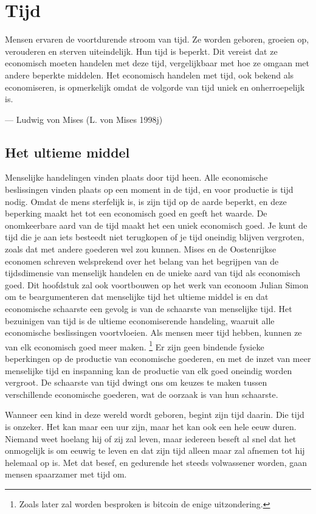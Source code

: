 \documentclass[
  a5paper,
  smalldemyvopaper,11pt,twoside,onecolumn,openright,extrafontsizes,
hidelinks]{memoir}
\begin{document}
\chapter{Tijd}\label{sec-tijd}

Mensen ervaren de voortdurende stroom van tijd. Ze worden geboren,
groeien op, verouderen en sterven uiteindelijk. Hun tijd is beperkt. Dit
vereist dat ze economisch moeten handelen met deze tijd, vergelijkbaar
met hoe ze omgaan met andere beperkte middelen. Het economisch handelen
met tijd, ook bekend als economiseren, is opmerkelijk omdat de volgorde
van tijd uniek en onherroepelijk is.

--- Ludwig von Mises (L. von Mises 1998j)

\section{Het ultieme middel}\label{het-ultieme-middel}

Menselijke handelingen vinden plaats door tijd heen. Alle economische
beslissingen vinden plaats op een moment in de tijd, en voor productie
is tijd nodig. Omdat de mens sterfelijk is, is zijn tijd op de aarde
beperkt, en deze beperking maakt het tot een economisch goed en geeft
het waarde. De onomkeerbare aard van de tijd maakt het een uniek
economisch goed. Je kunt de tijd die je aan iets besteedt niet
terugkopen of je tijd oneindig blijven vergroten, zoals dat met andere
goederen wel zou kunnen. Mises en de Oostenrijkse economen schreven
welsprekend over het belang van het begrijpen van de tijdsdimensie van
menselijk handelen en de unieke aard van tijd als economisch goed. Dit
hoofdstuk zal ook voortbouwen op het werk van econoom Julian Simon om te
beargumenteren dat menselijke tijd het ultieme middel is en dat
economische schaarste een gevolg is van de schaarste van menselijke
tijd. Het bezuinigen van tijd is de ultieme economiserende handeling,
waaruit alle economische beslissingen voortvloeien. Als mensen meer tijd
hebben, kunnen ze van elk economisch goed meer maken. \footnote{Zoals
  later zal worden besproken is bitcoin de enige uitzondering.} Er zijn
geen bindende fysieke beperkingen op de productie van economische
goederen, en met de inzet van meer menselijke tijd en inspanning kan de
productie van elk goed oneindig worden vergroot. De schaarste van tijd
dwingt ons om keuzes te maken tussen verschillende economische goederen,
wat de oorzaak is van hun schaarste.

Wanneer een kind in deze wereld wordt geboren, begint zijn tijd daarin.
Die tijd is onzeker. Het kan maar een uur zijn, maar het kan ook een
hele eeuw duren. Niemand weet hoelang hij of zij zal leven, maar
iedereen beseft al snel dat het onmogelijk is om eeuwig te leven en dat
zijn tijd alleen maar zal afnemen tot hij helemaal op is. Met dat besef,
en gedurende het steeds volwassener worden, gaan mensen spaarzamer met
tijd om.
\end{document}

